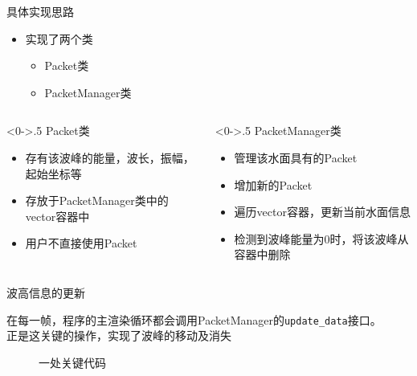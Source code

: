 \documentclass[handout,t]{beamer}
\begin{document}
\begin{frame}{具体实现思路}

\begin{itemize}
  \item 实现了两个类
  \begin{itemize}
    \item Packet类
    \item PacketManager类
  \end{itemize}
\end{itemize}


\begin{columns} %
  \begin{column}<0->{.5\textwidth}
    Packet类
    \begin{itemize}
      \item 存有该波峰的能量，波长，振幅，起始坐标等
      \item 存放于PacketManager类中的vector容器中
      \item 用户不直接使用Packet
    \end{itemize}
  \end{column}%
  \hfill%
  \begin{column}<0->{.5\textwidth}      
    PacketManager类
    \begin{itemize}
      \item 管理该水面具有的Packet
      \item 增加新的Packet
      \item 遍历vector容器，更新当前水面信息
      \item 检测到波峰能量为0时，将该波峰从容器中删除
    \end{itemize}
  \end{column}%
\end{columns}
  
\end{frame}

\begin{frame}{波高信息的更新}

在每一帧，程序的主渲染循环都会调用PacketManager的\texttt{update\_data}接口。\\

正是这关键的操作，实现了波峰的移动及消失

\begin{figure}[thpb]
  \centering
    \label{fig:wyf-code}
    \caption{一处关键代码}
\end{figure}

\end{frame}
\end{document}
